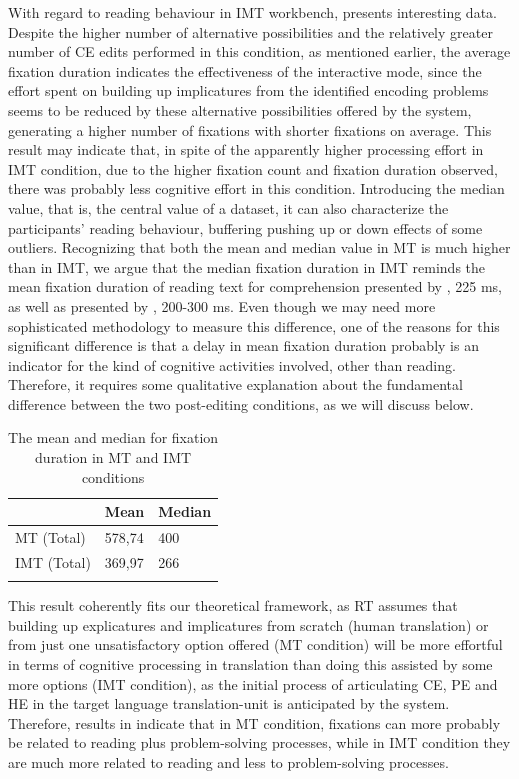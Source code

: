 \documentclass[output=paper]{langsci/langscibook}
\begin{document}
With regard to reading behaviour in IMT workbench,  presents interesting data. Despite the higher number of alternative possibilities and the relatively greater number of CE edits performed in this condition, as mentioned earlier, the average fixation duration indicates the effectiveness of the interactive mode, since the effort spent on building up implicatures from the identified encoding problems seems to be reduced by these alternative possibilities offered by the system, generating a higher number of fixations with shorter fixations on average. This result may indicate that, in spite of the apparently higher processing effort in IMT condition, due to the higher fixation count and fixation duration observed, there was probably less cognitive effort in this condition. Introducing the median value, that is, the central value of a dataset, it can also characterize the participants' reading behaviour, buffering pushing up or down effects of some outliers. Recognizing that both the mean and median value in MT is much higher than in IMT, we argue that the median fixation duration in IMT reminds the mean fixation duration of reading text for comprehension presented by \citet{Just1980}, 225 ms, as well as presented by \citet{rayner1998}, 200-300 ms. Even though we may need more sophisticated methodology to measure this difference, one of the reasons for this significant difference is that a delay in mean fixation duration probably is an indicator for the kind of cognitive activities involved, other than reading. Therefore, it requires some qualitative explanation about the fundamental difference between the two post-editing conditions, as we will discuss below. 

\begin{table}
\begin{tabular}{lll}
\lsptoprule
& Mean & Median\\
\midrule
MT (Total) & 578,74 & 400\\
IMT (Total) & 369,97 & 266\\
\lspbottomrule
\end{tabular}
\caption{The mean and median for fixation duration in MT and IMT conditions}
\label{sarto:tab:4}
\end{table}


This result coherently fits our theoretical framework, as RT assumes that building up explicatures and implicatures from scratch (human translation) or from just one unsatisfactory option offered (MT condition) will be more effortful in terms of cognitive processing in translation than doing this assisted by some more options (IMT condition), as the initial process of articulating CE, PE and HE in the target language translation-unit is anticipated by the system. Therefore, results in  indicate that in MT condition, fixations can more probably be related to reading plus problem-solving processes, while in IMT condition they are much more related to reading and less to problem-solving processes.
\end{document}
